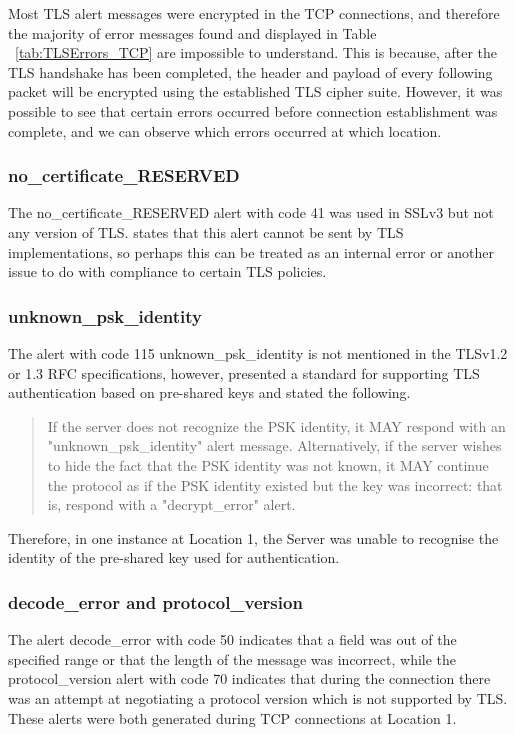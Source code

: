 \documentclass{l4proj}
\begin{document}
Most TLS alert messages were encrypted in the TCP connections, and therefore the majority of error messages found and displayed in Table ~\ref{tab:TLSErrors_TCP} are impossible to understand. This is because, after the TLS handshake has been completed, the header and payload of every following packet will be encrypted using the established TLS cipher suite. However, it was possible to see that certain errors occurred before connection establishment was complete, and we can observe which errors occurred at which location. 

\subsubsection{no\_certificate\_RESERVED} The no\_certificate\_RESERVED alert with code 41 was used in SSLv3 but not any version of TLS. \citet{Resc2018} states that this alert cannot be sent by TLS implementations, so perhaps this can be treated as an internal error or another issue to do with compliance to certain TLS policies. 

\subsubsection{unknown\_psk\_identity} The alert with code 115 unknown\_psk\_identity is not mentioned in the TLSv1.2 or 1.3 RFC specifications, however, \citet{Tscho2005} presented a standard for supporting TLS authentication based on pre-shared keys and stated the following.

\begin{quote}
    If the server does not recognize the PSK identity, it MAY respond with an "unknown\_psk\_identity" alert message.  Alternatively, if the server wishes to hide the fact that the PSK identity was not known, it MAY continue the protocol as if the PSK identity existed but the key was incorrect: that is, respond with a "decrypt\_error" alert. \citep{Tscho2005}
\end{quote}

Therefore, in one instance at Location 1, the Server was unable to recognise the identity of the pre-shared key used for authentication.

\subsubsection{decode\_error and protocol\_version} The alert decode\_error with code 50 indicates that a field was out of the specified range or that the length of the message was incorrect, while the protocol\_version alert with code 70 indicates that during the connection there was an attempt at negotiating a protocol version which is not supported by TLS. These alerts were both generated during TCP connections at Location 1.
\end{document}
